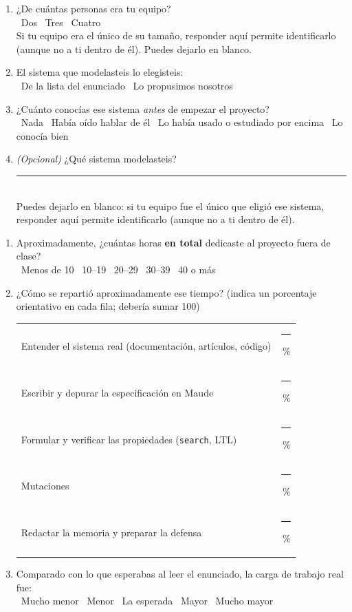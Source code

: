 \begin{enumerate}[leftmargin=*]

\item ¿De cu\'antas personas era tu equipo?\\
\cb\ Dos \qquad \cb\ Tres \qquad \cb\ Cuatro\\
{\small Si tu equipo era el \'unico de su tama\~no, responder aqu\'i permite
identificarlo (aunque no a ti dentro de \'el). Puedes dejarlo en blanco.}

\item El sistema que modelasteis lo elegisteis:\\
\cb\ De la lista del enunciado \qquad
\cb\ Lo propusimos nosotros

\item ¿Cu\'anto conoc\'ias ese sistema \emph{antes} de empezar el proyecto?\\
\cb\ Nada \quad
\cb\ Hab\'ia o\'ido hablar de \'el \quad
\cb\ Lo hab\'ia usado o estudiado por encima \quad
\cb\ Lo conoc\'ia bien

\item \emph{(Opcional)} ¿Qu\'e sistema modelasteis?
\rule{7cm}{0.4pt}\\
{\small Puedes dejarlo en blanco: si tu equipo fue el \'unico que eligi\'o
ese sistema, responder aqu\'i permite identificarlo (aunque no a ti dentro
de \'el).}

\end{enumerate}


\begin{enumerate}[leftmargin=*,resume]

\item Aproximadamente, ¿cu\'antas horas \textbf{en total} dedicaste al
proyecto fuera de clase?\\
\cb\ Menos de 10 \quad
\cb\ 10--19 \quad
\cb\ 20--29 \quad
\cb\ 30--39 \quad
\cb\ 40 o m\'as

\item ¿C\'omo se reparti\'o aproximadamente ese tiempo? (indica un porcentaje
orientativo en cada fila; deber\'ia sumar 100)

\smallskip
\begin{tabular}{@{}p{9cm}l@{}}
Entender el sistema real (documentaci\'on, art\'iculos, c\'odigo) & \rule{1.5cm}{0.4pt}\,\% \\
Escribir y depurar la especificaci\'on en Maude & \rule{1.5cm}{0.4pt}\,\% \\
Formular y verificar las propiedades (\texttt{search}, LTL) & \rule{1.5cm}{0.4pt}\,\% \\
Mutaciones & \rule{1.5cm}{0.4pt}\,\% \\
Redactar la memoria y preparar la defensa & \rule{1.5cm}{0.4pt}\,\% \\
\end{tabular}

\item Comparado con lo que esperabas al leer el enunciado, la carga de
trabajo real fue:\\
\cb\ Mucho menor \quad
\cb\ Menor \quad
\cb\ La esperada \quad
\cb\ Mayor \quad
\cb\ Mucho mayor

\end{enumerate}

